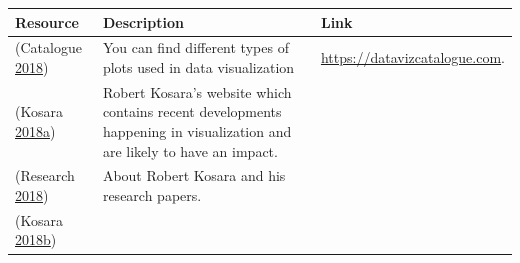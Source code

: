 \documentclass[]{book}
\begin{document}
\begin{longtable}[]{@{}lll@{}}
\toprule
\begin{minipage}[b]{0.15\columnwidth}\raggedright\strut
\textbf{Resource}\strut
\end{minipage} & \begin{minipage}[b]{0.28\columnwidth}\raggedright\strut
\textbf{Description}\strut
\end{minipage} & \begin{minipage}[b]{0.48\columnwidth}\raggedright\strut
\textbf{Link}\strut
\end{minipage}\tabularnewline
\midrule
\endhead
\begin{minipage}[t]{0.15\columnwidth}\raggedright\strut
(Catalogue \protect\hyperlink{ref-charts_viz}{2018})\strut
\end{minipage} & \begin{minipage}[t]{0.28\columnwidth}\raggedright\strut
You can find different types of plots used in data visualization\strut
\end{minipage} & \begin{minipage}[t]{0.48\columnwidth}\raggedright\strut
\href{https://datavizcatalogue.com/search.html}{https://datavizcatalogue.com}.\strut
\end{minipage}\tabularnewline
\begin{minipage}[t]{0.15\columnwidth}\raggedright\strut
(Kosara
\protect\hyperlink{ref-eagereyes_viz}{2018}\protect\hyperlink{ref-eagereyes_viz}{a})\strut
\end{minipage} & \begin{minipage}[t]{0.28\columnwidth}\raggedright\strut
Robert Kosara's website which contains recent developments happening in
visualization and are likely to have an impact.\strut
\end{minipage}\tabularnewline
\begin{minipage}[t]{0.15\columnwidth}\raggedright\strut
(Research \protect\hyperlink{ref-research_viz}{2018})\strut
\end{minipage} & \begin{minipage}[t]{0.28\columnwidth}\raggedright\strut
About Robert Kosara and his research papers.\strut
\end{minipage}\tabularnewline
\begin{minipage}[t]{0.15\columnwidth}\raggedright\strut
(Kosara
\protect\hyperlink{ref-twitter_Kosara}{2018}\protect\hyperlink{ref-twitter_Kosara}{b})\strut
\end{minipage} & \begin{minipage}[t]{0.28\columnwidth}\raggedright\strut

\end{minipage}
\end{longtable}
\end{document}
